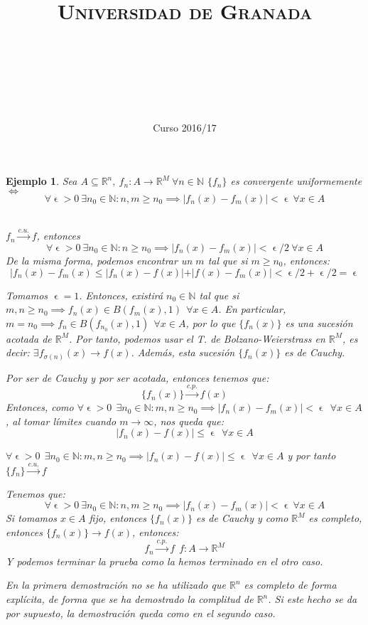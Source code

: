 \documentclass[11pt, a4paper, titlepage]{article}
\title{
  \normalfont \normalsize 
  \textsc{Universidad de Granada} \\ [25pt]    %
  \horrule{0.5pt} \\[0.4cm] %
  \huge \subject\\ %
  \horrule{2pt} \\[0.5cm] %
}
\author{\Large{\docauthor}}
\date{\vspace{-1.5em} \normalsize Curso 2016/17}
\makeatletter
\let\epsilon\upvarepsilon
\renewenvironment{proof}[1][\proofname] {\vspace{-15pt}\par\pushQED{\qed}\normalfont\topsep6\p@\@plus6\p@\relax\trivlist\item[\hskip\labelsep\it#1\@addpunct{.}]\ignorespaces}{\popQED\endtrivlist\@endpefalse}
\newcommand{\R}{\mathbb{R}}
\theoremstyle{theorem-style}
\theoremstyle{definition-style}
\theoremstyle{remark-style}
\theoremstyle{example-style}
\newtheorem*{ejemplo}{Ejemplo}
\makeatother
\begin{document}
\maketitle  %




 \begin{ejemplo}
	Sea $A \subseteq \R^n, \ f_n :A \to \R^M \ 
	\forall n \in \mathbb{N}$
	$\{f_n\}$ es convergente uniformemente $\iff$
	\[
	\forall \epsilon > 0 \ \exists n_0 \in \mathbb{N} : n,m \geq n_0 \implies |f_n(x) - f_m(x) | < \epsilon \ \forall x \in A
	\]
	\begin{proof}[Solución]\hfill \\
\boxed{\Rightarrow}	$f_n \xrightarrow{c.u.} f$, entonces 
\[
\forall \epsilon > 0 \ \exists n_0 \in \mathbb{N} : n \geq n_0 \implies |f_n(x) - f_m(x) | < \epsilon/2 \ \forall x \in A
\]
De la misma forma, podemos encontrar un $m$ tal que si $m\geq n_0$, entonces:
\[
|f_n(x)-f_m(x) \leq |f_n(x)-f(x)| + |f(x)-f_m(x) | < \epsilon/2 +\epsilon/2 = \epsilon
\]

\boxed{\Leftarrow} Tomamos $\epsilon = 1$. Entonces, existirá $n_0\in \mathbb{N}$ tal que si $m,n\geq n_0 \implies f_n(x) \in B(f_m(x),1) \ \ \forall x \in A$. En particular, $m=n_0 \implies f_n \in B(f_{n_0}(x),1) \ \ \forall x \in A$, por lo que $\{f_n(x)\}$ es una sucesión acotada de $\R^M$. Por tanto, podemos usar el T. de Bolzano-Weierstrass en $\R^M$, es decir:
$
\exists f_{\sigma(n)}(x) \to f(x)
$. Además, esta sucesión $\{f_n(x)\}$ es de Cauchy. 

Por ser de Cauchy y por ser acotada, entonces tenemos que:
\[
\{f_n(x)\}\xrightarrow{c.p.} f(x)
\]
Entonces, como $\forall \epsilon > 0 \ \ \exists n_0 \in \mathbb{N}: m,n \geq n_0 \implies |f_n(x) - f_m(x)| < \epsilon \ \ \forall x \in A$, al tomar límites cuando $m\to \infty$, nos queda que:
\[
|f_n(x)-f(x) | \leq \epsilon \ \ \forall x \in A
\]

$\forall \epsilon > 0 \ \ \exists n_0 \in \mathbb{N}: m,n \geq n_0 \implies |f_n(x)-f(x) | \leq \epsilon \ \ \forall x \in A$ y por tanto $\{f_n\} \xrightarrow{c.u.} f$
\end{proof}

\begin{proof}[Solución Alternativa]
	Tenemos que:
	\[
	\forall \epsilon > 0 \ \exists n_0 \in \mathbb{N} : n,m \geq n_0 \implies |f_n(x) - f_m(x) | < \epsilon \ \forall x \in A
	\]
	Si tomamos $x\in A$ fijo, entonces $\{f_n(x)\}$ es de Cauchy y como $\R^M$ es completo, entonces $\{f_n(x)\}\to f(x)$, entonces:
	\[
	f_n \xrightarrow{c.p.} f \ \ f:A \to \R^M
	\]
	Y podemos terminar la prueba como la hemos terminado en el otro caso.
	
	
	En la primera demostración no se ha utilizado que $\R^n$ es completo de forma explícita, de forma que se ha demostrado la complitud de $\R^n$. Si este hecho se da por supuesto, la demostración queda como en el segundo caso.
\end{proof}
\end{ejemplo}
\end{document}
